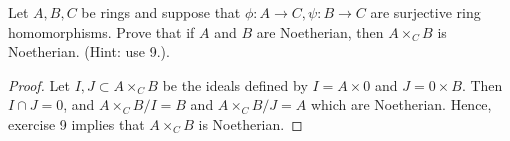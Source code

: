 \documentclass{article}
\begin{document}
 Let $A, B, C$ be rings and suppose that $\phi: A \to C, \psi: B \to C$ are surjective ring homomorphisms. Prove that if $A$ and $B$ are Noetherian, then $A \times_C B$ is Noetherian. (Hint: use 9.).
\begin{proof}
Let $I,J \subset A \times_C B$ be the ideals defined by $I = A \times 0$ and $J = 0 \times B$. Then $I \cap J = 0$, and $A \times_C B/I = B$ and $A \times_C B/J = A$ which are Noetherian.  Hence, exercise 9 implies that $A \times_C B$ is Noetherian.
\end{proof}
\end{document}
